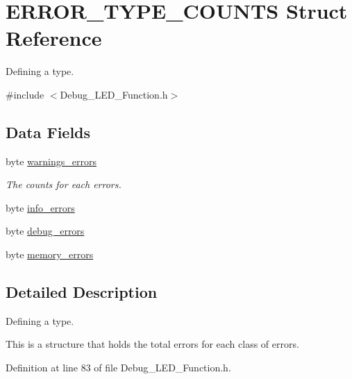 \hypertarget{struct_e_r_r_o_r___t_y_p_e___c_o_u_n_t_s}{\section{E\-R\-R\-O\-R\-\_\-\-T\-Y\-P\-E\-\_\-\-C\-O\-U\-N\-T\-S Struct Reference}
\label{struct_e_r_r_o_r___t_y_p_e___c_o_u_n_t_s}
}


Defining a type.  




{\ttfamily \#include $<$Debug\-\_\-\-L\-E\-D\-\_\-\-Function.\-h$>$}

\subsection*{Data Fields}
\begin{DoxyCompactItemize}
\item 
byte \hyperlink{struct_e_r_r_o_r___t_y_p_e___c_o_u_n_t_s_a64c977b503d70640ec9684efb24c4202}{warnings\-\_\-errors}
\begin{DoxyCompactList}\small\item\em The counts for each errors. \end{DoxyCompactList}\item 
byte \hyperlink{struct_e_r_r_o_r___t_y_p_e___c_o_u_n_t_s_ae459913bb763329bb7b83be2461515a0}{info\-\_\-errors}
\item 
byte \hyperlink{struct_e_r_r_o_r___t_y_p_e___c_o_u_n_t_s_a384be2b5593f1616b5eff78838ab117d}{debug\-\_\-errors}
\item 
byte \hyperlink{struct_e_r_r_o_r___t_y_p_e___c_o_u_n_t_s_a30efabeb76296389bd2b184d1361c773}{memory\-\_\-errors}
\end{DoxyCompactItemize}


\subsection{Detailed Description}
Defining a type. 

This is a structure that holds the total errors for each class of errors. 

Definition at line 83 of file Debug\-\_\-\-L\-E\-D\-\_\-\-Function.\-h.



